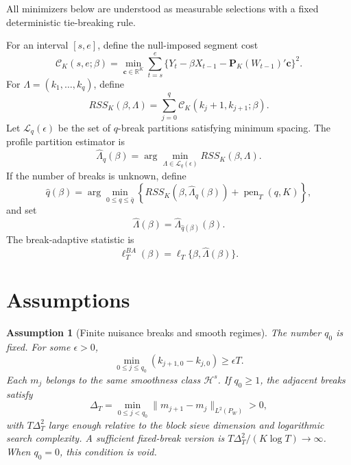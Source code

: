 \documentclass[12pt]{article}
\numberwithin{equation}{section}
\newtheorem{assumption}{Assumption}
\theoremstyle{definition}
\newcommand{\R}{\mathbb R}
\begin{document}
All minimizers below are understood as measurable selections with a fixed deterministic tie-breaking rule.

For an interval \([s,e]\), define the null-imposed segment cost
\begin{equation}
    \mathcal C_K(s,e;\beta)
    =
    \min_{\bm c\in\R^K}
    \sum_{t=s}^e
    \{Y_t-\beta X_{t-1}-\bm P_K(W_{t-1})'\bm c\}^2.
    \label{eq:segment-cost}
\end{equation}
For \(\Lambda=(k_1,\ldots,k_q)\), define
\begin{equation}
    RSS_K(\beta,\Lambda)
    =
    \sum_{j=0}^{q}
    \mathcal C_K(k_j+1,k_{j+1};\beta).
    \label{eq:rss}
\end{equation}
Let \(\mathcal L_q(\epsilon)\) be the set of \(q\)-break partitions satisfying minimum spacing. The profile partition estimator is
\begin{equation}
    \widehat\Lambda_q(\beta)
    =
    \arg\min_{\Lambda\in\mathcal L_q(\epsilon)}
    RSS_K(\beta,\Lambda).
    \label{eq:lambda-hat-q}
\end{equation}
If the number of breaks is unknown, define
\begin{equation}
    \widehat q(\beta)
    =
    \arg\min_{0\leq q\leq\bar q}
    \left\{
    RSS_K(\beta,\widehat\Lambda_q(\beta))
    +
    \operatorname{pen}_T(q,K)
    \right\},
    \label{eq:qhat}
\end{equation}
and set
\[
    \widehat\Lambda(\beta)=
    \widehat\Lambda_{\widehat q(\beta)}(\beta).
\]
The break-adaptive statistic is
\begin{equation}
    \ell_T^{BA}(\beta)
    =
    \ell_T\{\beta,\widehat\Lambda(\beta)\}.
    \label{eq:ba-stat}
\end{equation}

\section{Assumptions}

\begin{assumption}[Finite nuisance breaks and smooth regimes]
\label{ass:breaks}
The number \(q_0\) is fixed. For some \(\epsilon>0\),
\[
    \min_{0\leq j\leq q_0}(k_{j+1,0}-k_{j,0})\geq \epsilon T.
\]
Each \(m_j\) belongs to the same smoothness class \(\mathcal H^s\). If \(q_0\geq1\), the adjacent breaks satisfy
\[
    \Delta_T
    =
    \min_{0\leq j<q_0}
    \|m_{j+1}-m_j\|_{L^2(P_W)}
    >0,
\]
with \(T\Delta_T^2\) large enough relative to the block sieve dimension and logarithmic search complexity. A sufficient fixed-break version is \(T\Delta_T^2/(K\log T)\to\infty\). When \(q_0=0\), this condition is void.
\end{assumption}
\end{document}
